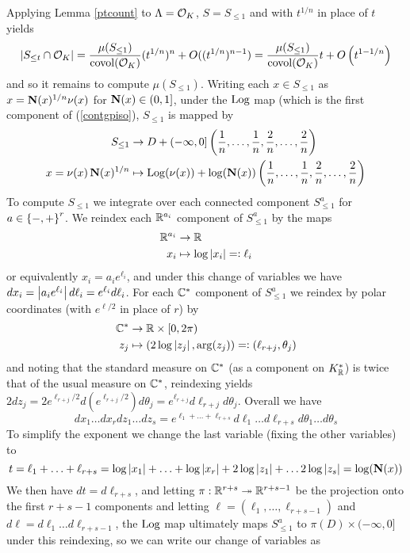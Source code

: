 \documentclass[11pt]{report}
\begin{document}
Applying Lemma \ref{ptcount} to $\Lambda = \mathcal{O}_K$, $S = S_{\leq 1}$ and with $t^{1/n}$ in place of $t$ yields
\begin{align}
    \left| S_{\leq t} \cap \mathcal{O}_K \right| = \frac{\mu(S_{\leq 1})}{\operatorname{covol}(\mathcal{O}_K)}(t^{1/n})^n + O((t^{1/n})^{n - 1}) = \frac{\mu(S_{\leq 1})}{\operatorname{covol}(\mathcal{O}_K)}t + O\left(  t^{1 - 1/n}  \right)
\end{align}
and so it remains to compute $\mu(S_{\leq 1})$. Writing each $x \in S_{\leq 1}$ as $x = \operatorname{\mathbf{N}}(x)^{1/n}\nu(x)$ for $\operatorname{\mathbf{N}}(x) \in (0, 1]$, under the $\operatorname{Log}$ map (which is the first component of (\ref{contgpiso}), $S_{\leq 1}$ is mapped by
\begin{align*}
    S_{\leq 1} &\to D + (-\infty, 0]\left(  \frac1n, \ldots, \frac1n, \frac2n, \ldots, \frac2n  \right) \\
    x = \nu(x)\operatorname{\mathbf{N}}(x)^{1/n} &\mapsto \operatorname{Log}(\nu(x)) + \log(\operatorname{\mathbf{N}}(x))\left(  \frac1n, \ldots, \frac1n, \frac2n, \ldots, \frac2n  \right)
\end{align*}
To compute $S_{\leq 1}$ we integrate over each connected component $S_{\leq 1}^a$ for $a \in \left\{  -, +  \right\}^r$. We reindex each $\mathbb{R}^{a_i}$ component of $S_{\leq 1}^a$ by the maps
\begin{align*}
    \mathbb{R}^{a_i} &\to \mathbb{R} \\
    x_i &\mapsto \log\left| x_i \right| =\vcentcolon \ell_i
\end{align*}
or equivalently $x_i = a_ie^{\ell_i}$, and under this change of variables we have $dx_i = \left| a_ie^{\ell_i} \right|d\ell_i = e^{\ell_i}d\ell_i$. For each $\mathbb{C}^*$ component of $S_{\leq 1}^a$ we reindex by polar coordinates (with $e^{\ell/2}$ in place of $r$) by
\begin{align*}
    \mathbb{C}^* &\to \mathbb{R} \times [0, 2\pi) \\
    z_j &\mapsto (2\log\left| z_j \right|, \arg(z_j)) =\vcentcolon (\ell_{r + j}, \theta_j)
\end{align*}
and noting that the standard measure on $\mathbb{C}^*$ (as a component on $K_{\mathbb{R}}^*$) is twice that of the usual measure on $\mathbb{C}^*$, reindexing yields $2dz_j = 2e^{\ell_{r + j}/2}d(e^{\ell_{r + j}/2})d\theta_j = e^{\ell_{r + j}}d\ell_{r + j}d\theta_j$. Overall we have
$$
    dx_1 \ldots dx_r dz_1 \ldots dz_s = e^{\ell_1 + \ldots + \ell_{r + s}}d\ell_1 \ldots d\ell_{r + s}d\theta_1 \ldots d\theta_s
$$
To simplify the exponent we change the last variable (fixing the other variables) to 
$$
    t = \ell_1 + \ldots + \ell_{r + s} = \log\left| x_1 \right| + \ldots + \log\left| x_r \right| + 2\log\left| z_1 \right| + \ldots 2\log\left| z_s \right| = \log(\operatorname{\mathbf{N}}(x))
$$
We then have $dt = d\ell_{r + s}$, and letting $\pi : \mathbb{R}^{r + s} \twoheadrightarrow \mathbb{R}^{r + s - 1}$ be the projection onto the first $r + s - 1$ components and letting $\ell = (\ell_1, \ldots, \ell_{r + s - 1})$ and $d\ell = d\ell_1 \ldots d\ell_{r + s - 1}$, the $\operatorname{Log}$ map ultimately maps $S_{\leq 1}^a$ to $\pi(D) \times (-\infty, 0]$ under this reindexing, so we can write our change of variables as
\end{document}
